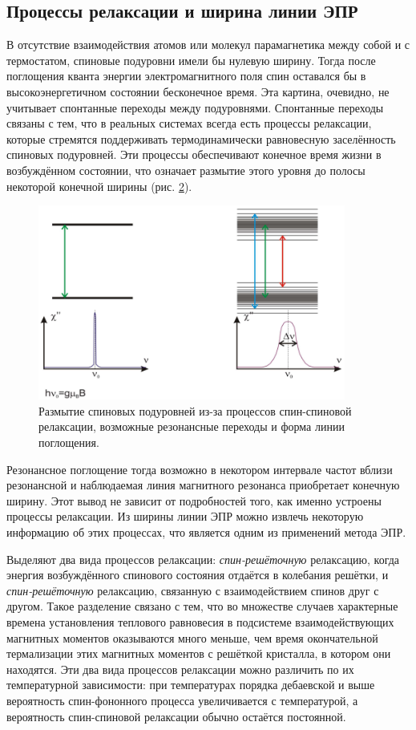 \documentclass[a4paper,12pt]{article}
\begin{document}
\subsection{Процессы релаксации и ширина линии ЭПР}
В отсутствие взаимодействия атомов или молекул парамагнетика между собой и с термостатом, спиновые подуровни имели бы нулевую ширину. Тогда после поглощения
кванта энергии электромагнитного поля спин оставался бы в высокоэнергетичном состоянии
бесконечное время. Эта картина, очевидно, не учитывает спонтанные переходы между подуровнями. Спонтанные переходы связаны с тем, что в реальных системах всегда есть процессы релаксации, которые стремятся поддерживать термодинамически равновесную заселённость спиновых подуровней. Эти процессы обеспечивают конечное время жизни в возбуждённом состоянии, что означает размытие этого уровня до полосы некоторой конечной ширины (рис. \hyperref[fig: Level splitting]{2}). 
\begin{figure}\label{fig: Level splitting}
    \centering
    \includegraphics[width = 0.9\textwidth]{Level splitting.png}
    \caption{Размытие спиновых подуровней из-за процессов спин-спиновой релаксации,
            возможные резонансные переходы и форма линии поглощения.}
\end{figure}

Резонансное поглощение тогда возможно в некотором интервале частот вблизи резонансной и наблюдаемая линия магнитного резонанса приобретает конечную ширину. Этот вывод не зависит от подробностей того, как именно устроены процессы релаксации. Из ширины линии ЭПР можно извлечь некоторую информацию об этих процессах, что является одним из применений метода ЭПР. 

Выделяют два вида процессов релаксации: \textit{спин-решёточную} релаксацию, когда энергия возбуждённого спинового состояния отдаётся в колебания решётки, и \textit{спин-решёточную} релаксацию, связанную с взаимодействием спинов друг с другом. Такое разделение связано с тем, что во множестве случаев характерные времена установления теплового равновесия в подсистеме взаимодействующих магнитных моментов оказываются много меньше, чем время окончательной термализации этих магнитных моментов с решёткой кристалла, в котором они находятся. Эти два вида процессов релаксации можно различить по их температурной зависимости: при температурах порядка дебаевской и выше вероятность спин-фононного процесса увеличивается с температурой, а вероятность спин-спиновой релаксации обычно остаётся постоянной.
\end{document}
